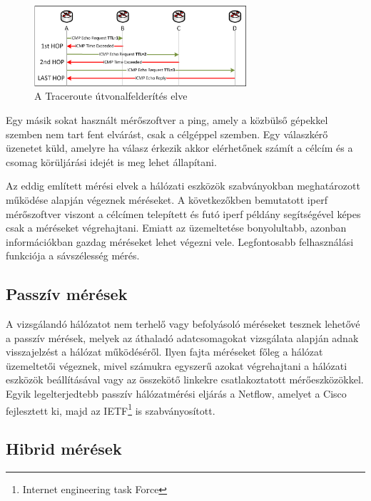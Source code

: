 \begin{figure}[h]
	\centering
	\includegraphics[width=0.7\textwidth, keepaspectratio]{figures/traceroute-works.png}
	\caption{A Traceroute útvonalfelderítés elve\protect\footnotemark}
	\label{fig:traceroute-works}
\end{figure}


Egy másik sokat használt mérőszoftver a ping, amely a közbülső gépekkel szemben nem tart fent elvárást, csak a célgéppel szemben. Egy válaszkérő üzenetet küld, amelyre ha válasz érkezik akkor elérhetőnek számít a célcím és a csomag körüljárási idejét is meg lehet állapítani.

Az eddig említett mérési elvek a hálózati eszközök szabványokban meghatározott működése alapján végeznek méréseket. A következőkben bemutatott iperf mérőszoftver viszont a célcímen telepített és futó iperf példány segítségével képes csak a méréseket végrehajtani. Emiatt az üzemeltetése bonyolultabb, azonban információkban gazdag méréseket lehet végezni vele. Legfontosabb felhasználási funkciója a sávszélesség mérés.

\subsection{Passzív mérések}

A vizsgálandó hálózatot nem terhelő vagy befolyásoló méréseket tesznek lehetővé a passzív mérések, melyek az áthaladó adatcsomagokat vizsgálata alapján adnak visszajelzést a hálózat működéséről. Ilyen fajta méréseket főleg a hálózat üzemeltetői végeznek, mivel számukra egyszerű azokat végrehajtani a hálózati eszközök beállításával vagy az összekötő linkekre csatlakoztatott mérőeszközökkel. Egyik legelterjedtebb passzív hálózatmérési eljárás a Netflow, amelyet a Cisco fejlesztett ki, majd az IETF\footnote{Internet engineering task Force} is szabványosított.

\subsection{Hibrid mérések}

